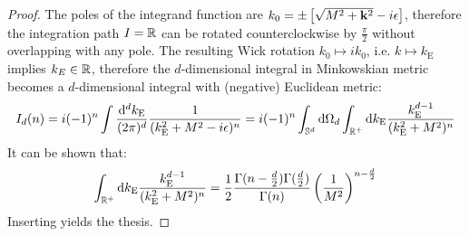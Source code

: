 \begin{proofbox}
  \begin{proof}
    The poles of the integrand function are $ k_0 = \pm \left[ \sqrt{M^2 + \mathbf{k}^2} - i\epsilon \right] $, therefore the integration path $ I = \mathbb{R} $ can be rotated counterclockwise by $ \frac{\pi}{2} $ without overlapping with any pole. The resulting Wick rotation $ k_0 \mapsto i k_0 $, i.e. $ k \mapsto k_\text{E} $ implies $ k_E \in \mathbb{R} $, therefore the $ d $-dimensional integral in Minkowskian metric becomes a $ d $-dimensional integral with (negative) Euclidean metric:
    \begin{equation*}
      I_d(n) = i (-1)^n \int \frac{\mathrm{d}^dk_\text{E}}{(2\pi)^d} \frac{1}{(k_\text{E}^2 + M^2 - i\epsilon)^n} = i (-1)^n \int_{\mathbb{S}^d} \mathrm{d} \Omega_d \int_{\mathbb{R}^+} \mathrm{d} k_\text{E} \frac{k_\text{E}^{d-1}}{(k_\text{E}^2 + M^2)^n}
    \end{equation*}
    It can be shown that:
    \begin{equation}
      \int_{\mathbb{R}^+} \mathrm{d} k_\text{E} \frac{k_\text{E}^{d-1}}{(k_\text{E}^2 + M^2)^n} = \frac{1}{2} \frac{\Gamma(n - \frac{d}{2}) \Gamma(\frac{d}{2})}{\Gamma(n)} \left( \frac{1}{M^2} \right)^{n - \frac{d}{2}}
    \end{equation}
    Inserting  yields the thesis.
  \end{proof}
\end{proofbox}

